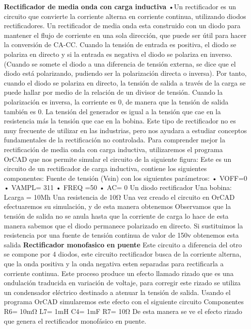 \textbf{Rectificador de media onda con carga inductiva}
•Un rectificador es un circuito que convierte la corriente alterna en corriente continua, utilizando diodos rectificadores.
Un rectificador de media onda esta construido con un diodo para mantener el flujo de corriente en una sola dirección, que puede ser útil para hacer la conversión de CA-CC. Cuando la tensión de entrada es positiva, el diodo se polariza en directo y si la entrada es negativa el diodo se polariza en inverso. (Cuando se somete el diodo a una diferencia de tensión externa, se dice que el diodo está polarizando, pudiendo ser la polarización directa o inversa).
Por tanto, cuando el diodo se polariza en directo, la tensión de salida a través de la carga se puede hallar por medio de la relación de un divisor de tensión. Cuando la polarización es inversa, la corriente es 0, de manera que la tensión de salida también es 0. 
La tensión del generador es igual a la tensión que cae en la resistencia más la tensión que cae en la bobina.
Este tipo de rectificador no es muy frecuente de utilizar en las industrias, pero nos ayudara a estudiar conceptos fundamentales de la rectificación no controlada. Para comprender mejor la rectificación de media onda con carga inductiva, utilizaremos el programa OrCAD que nos permite simular el circuito de la siguiente figura:
Este es un circuito de un rectificador de carga inductiva, contiene los siguientes componentes:
Fuente de tensión (Vsin) con los siguientes parámetros:
•	VOFF=0
•	VAMPL= 311 
•	FREQ =50
•	AC= 0
Un diodo rectificador 
Una bobina: Lcarga = 10Mh
Una resistencia de 10Ω
Una vez creado el circuito en OrCAD efectuaremos su simulación, y de esta manera obtenemos 
Observamos que la tensión de salida no se anula hasta que la corriente de carga lo hace de esta manera sabemos que el diodo permanece polarizado en directo. 
Si sustituimos la resistencia por una fuente de tensión continua de valor de 150v obtenemos esta salida
\textbf{Rectificador monofasico en puente}
Este circuito a diferencia del otro se compone por 4 diodos, este circuito rectificador busca de la corriente alterna, que la onda positiva y la onda negativa esten separadas para rectificarla a corriente continua. Este proceso produce un efecto llamado rizado que es una ondulación traducida en variación de voltaje, para corregir este rizado se utiliza un condensador eléctrico destinado a atenuar la tensión de salida.
Usando el programa OrCAD simularemos este efecto con el siguiente circuito
Componentes 
R6= 10mΩ
L7= 1mH
C4= 1mF
R7= 10Ω
De esta manera se ve el efecto rizado que genera el rectificador monofásico en puente.
